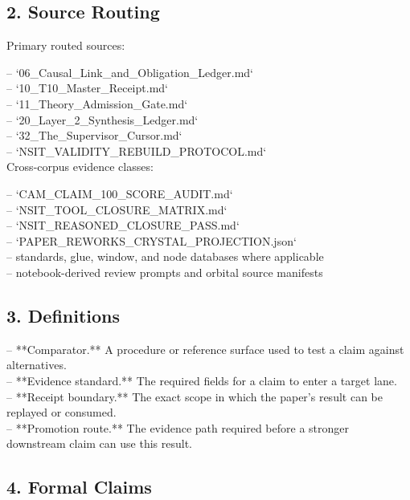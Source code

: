 \documentclass[11pt]{article}
\begin{document}
\subsection*{2. Source Routing}

Primary routed sources:

\noindent{}-- `06\_Causal\_Link\_and\_Obligation\_Ledger.md`\\
\noindent{}-- `10\_T10\_Master\_Receipt.md`\\
\noindent{}-- `11\_Theory\_Admission\_Gate.md`\\
\noindent{}-- `20\_Layer\_2\_Synthesis\_Ledger.md`\\
\noindent{}-- `32\_The\_Supervisor\_Cursor.md`\\
\noindent{}-- `NSIT\_VALIDITY\_REBUILD\_PROTOCOL.md`\\

Cross-corpus evidence classes:

\noindent{}-- `CAM\_CLAIM\_100\_SCORE\_AUDIT.md`\\
\noindent{}-- `NSIT\_TOOL\_CLOSURE\_MATRIX.md`\\
\noindent{}-- `NSIT\_REASONED\_CLOSURE\_PASS.md`\\
\noindent{}-- `PAPER\_REWORKS\_CRYSTAL\_PROJECTION.json`\\
\noindent{}-- standards, glue, window, and node databases where applicable\\
\noindent{}-- notebook-derived review prompts and orbital source manifests\\

\subsection*{3. Definitions}

\noindent{}-- **Comparator.** A procedure or reference surface used to test a claim against alternatives.\\
\noindent{}-- **Evidence standard.** The required fields for a claim to enter a target lane.\\
\noindent{}-- **Receipt boundary.** The exact scope in which the paper's result can be replayed or consumed.\\
\noindent{}-- **Promotion route.** The evidence path required before a stronger downstream claim can use this result.\\

\subsection*{4. Formal Claims}
\end{document}
